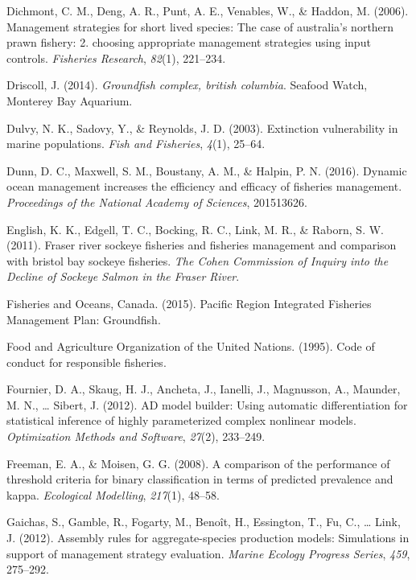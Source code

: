 \documentclass[12pt,]{scrartcl}
\begin{document}
\hypertarget{ref-dichmont2006management2}{}
Dichmont, C. M., Deng, A. R., Punt, A. E., Venables, W., \& Haddon, M.
(2006). Management strategies for short lived species: The case of
australia's northern prawn fishery: 2. choosing appropriate management
strategies using input controls. \emph{Fisheries Research},
\emph{82}(1), 221--234.

\hypertarget{ref-Driscoll2014Groundfish-comp}{}
Driscoll, J. (2014). \emph{Groundfish complex, british columbia}.
Seafood Watch, Monterey Bay Aquarium.

\hypertarget{ref-dulvy2003extinction}{}
Dulvy, N. K., Sadovy, Y., \& Reynolds, J. D. (2003). Extinction
vulnerability in marine populations. \emph{Fish and Fisheries},
\emph{4}(1), 25--64.

\hypertarget{ref-dunn2016dynamic}{}
Dunn, D. C., Maxwell, S. M., Boustany, A. M., \& Halpin, P. N. (2016).
Dynamic ocean management increases the efficiency and efficacy of
fisheries management. \emph{Proceedings of the National Academy of
Sciences}, 201513626.

\hypertarget{ref-english2011fraser}{}
English, K. K., Edgell, T. C., Bocking, R. C., Link, M. R., \& Raborn,
S. W. (2011). Fraser river sockeye fisheries and fisheries management
and comparison with bristol bay sockeye fisheries. \emph{The Cohen
Commission of Inquiry into the Decline of Sockeye Salmon in the Fraser
River}.

\hypertarget{ref-PRIFMP2015}{}
Fisheries and Oceans, Canada. (2015). Pacific Region Integrated
Fisheries Management Plan: Groundfish.

\hypertarget{ref-FAO1995}{}
Food and Agriculture Organization of the United Nations. (1995). Code of
conduct for responsible fisheries.

\hypertarget{ref-fournier2012ad}{}
Fournier, D. A., Skaug, H. J., Ancheta, J., Ianelli, J., Magnusson, A.,
Maunder, M. N., \ldots{} Sibert, J. (2012). AD model builder: Using
automatic differentiation for statistical inference of highly
parameterized complex nonlinear models. \emph{Optimization Methods and
Software}, \emph{27}(2), 233--249.

\hypertarget{ref-freeman2008comparison}{}
Freeman, E. A., \& Moisen, G. G. (2008). A comparison of the performance
of threshold criteria for binary classification in terms of predicted
prevalence and kappa. \emph{Ecological Modelling}, \emph{217}(1),
48--58.

\hypertarget{ref-gaichas2012assembly}{}
Gaichas, S., Gamble, R., Fogarty, M., Benoît, H., Essington, T., Fu, C.,
\ldots{} Link, J. (2012). Assembly rules for aggregate-species
production models: Simulations in support of management strategy
evaluation. \emph{Marine Ecology Progress Series}, \emph{459}, 275--292.
\end{document}
